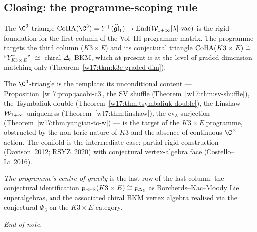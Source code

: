 \subsection{Closing: the programme-scoping rule}
\label{w17:subsec:programme-scoping}

The $\C^3$-triangle
$\CoHA(\C^3) = Y^+(\gghone) \to \mathrm{End}(\Wilpha[\lambda]\text{-vac})$
is the rigid foundation for the first column of the Vol~III programme matrix.
The programme targets the third column ($K3 \times E$) and its conjectural
triangle $\mathrm{CoHA}(K3 \times E) \cong$ ``$Y^+_{K3 \times E}$'' $\cong$
chiral-$\Delta_5$-BKM, which at present is at the level of graded-dimension
matching only (Theorem~\ref{w17:thm:k3e-graded-dim}).

The $\C^3$-triangle is the template: its unconditional content ---
Proposition~\ref{w17:prop:jacobi-c3}, the SV shuffle
(Theorem~\ref{w17:thm:sv-shuffle}), the Tsymbaliuk double
(Theorem~\ref{w17:thm:tsymbaliuk-double}), the Linshaw $\mathcal{W}_{1+\infty}$ uniqueness
(Theorem~\ref{w17:thm:linshaw}), the $\mathrm{ev}_\lambda$ surjection
(Theorem~\ref{w17:thm:yangian-to-w}) --- is the target of the
$K3 \times E$ programme, obstructed by the non-toric nature of $K3$ and the
absence of continuous $\C^\times$-action. The conifold is the intermediate
case: partial rigid construction (Davison~2012; RSYZ~2020) with conjectural
vertex-algebra face (Costello--Li~2016).

\emph{The programme's centre of gravity} is the last row of the last column:
the conjectural identification
$\mathfrak{g}_{\mathrm{BPS}}(K3 \times E) \cong \mathfrak{g}_{\Delta_5}$ as Borcherds--Kac--Moody Lie superalgebras,
and the associated chiral BKM vertex algebra realised via the conjectural
$\Phi_3$ on the $K3 \times E$ category.

\emph{End of note.}
